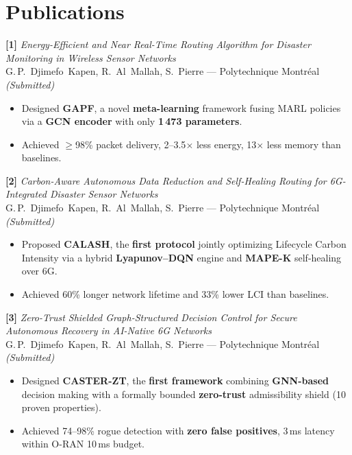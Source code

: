 \documentclass[10pt,a4paper,sans]{moderncv}
\begin{document}
\section{Publications}

\textbf{[1]} \textit{Energy-Efficient and Near Real-Time Routing Algorithm for
Disaster Monitoring in Wireless Sensor Networks}\\
G.\,P.~Djimefo~Kapen, R.~Al~Mallah, S.~Pierre --- Polytechnique
Montréal \hfill \textit{(Submitted)}
\begin{itemize}[leftmargin=1.5em, topsep=2pt, itemsep=0pt, parsep=0pt]
  \item Designed \textbf{GAPF}, a novel \textbf{meta-learning} framework fusing
        MARL policies via a \textbf{GCN encoder} with only \textbf{1\,473 parameters}.
  \item Achieved $\geq$98\% packet delivery, 2--3.5$\times$ less energy,
        13$\times$ less memory than baselines.
\end{itemize}

\vspace{0.4em}
\textbf{[2]} \textit{Carbon-Aware Autonomous Data Reduction and Self-Healing
Routing for 6G-Integrated Disaster Sensor Networks}\\
G.\,P.~Djimefo~Kapen, R.~Al~Mallah, S.~Pierre --- Polytechnique
Montréal \hfill \textit{(Submitted)}
\begin{itemize}[leftmargin=1.5em, topsep=2pt, itemsep=0pt, parsep=0pt]
  \item Proposed \textbf{CALASH}, the \textbf{first protocol} jointly optimizing
        Lifecycle Carbon Intensity via a hybrid \textbf{Lyapunov--DQN} engine
        and \textbf{MAPE-K} self-healing over 6G.
  \item Achieved 60\% longer network lifetime and 33\% lower LCI than baselines.
\end{itemize}

\vspace{0.4em}
\textbf{[3]} \textit{Zero-Trust Shielded Graph-Structured Decision Control for
Secure Autonomous Recovery in AI-Native 6G Networks}\\
G.\,P.~Djimefo~Kapen, R.~Al~Mallah, S.~Pierre --- Polytechnique
Montréal \hfill \textit{(Submitted)}
\begin{itemize}[leftmargin=1.5em, topsep=2pt, itemsep=0pt, parsep=0pt]
  \item Designed \textbf{CASTER-ZT}, the \textbf{first framework} combining
        \textbf{GNN-based} decision making with a formally bounded
        \textbf{zero-trust} admissibility shield (10 proven properties).
  \item Achieved 74--98\% rogue detection with \textbf{zero false positives},
        3\,ms latency within O-RAN 10\,ms budget.
\end{itemize}
\end{document}

